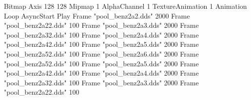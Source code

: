 {Bitmap
 	{Axis 128 128}
	{Mipmap 1}
	{AlphaChannel 1}
	{TextureAnimation 1}
	{Animation Loop AsyncStart Play}
	{Frame "pool_benz2a2.dds"	2000}
	{Frame "pool_benz2a22.dds"	100}
	{Frame "pool_benz2a3.dds"	2000}
	{Frame "pool_benz2a32.dds"	100}
	{Frame "pool_benz2a4.dds"	2000}
	{Frame "pool_benz2a42.dds"	100}
	{Frame "pool_benz2a5.dds"	2000}
	{Frame "pool_benz2a52.dds"	100}
	{Frame "pool_benz2a6.dds"	2000}
	{Frame "pool_benz2a52.dds"	100}
	{Frame "pool_benz2a5.dds"	2000}
	{Frame "pool_benz2a42.dds"	100}
	{Frame "pool_benz2a4.dds"	2000}
	{Frame "pool_benz2a32.dds"	100}
	{Frame "pool_benz2a3.dds"	2000}
	{Frame "pool_benz2a22.dds"	100}
}
